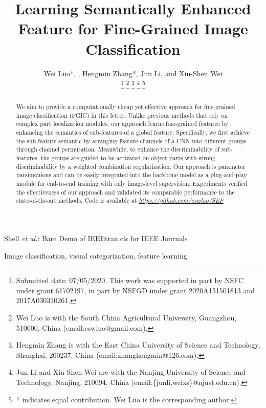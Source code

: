 \documentclass[journal]{IEEEtran}
\begin{document}
\title{Learning Semantically Enhanced Feature for Fine-Grained Image Classification}

\author{Wei Luo*, , Hengmin Zhang*, Jun Li, and Xiu-Shen Wei

\thanks{Submitted date: 07/05/2020. This work was supported in part by NSFC under grant 61702197, in part by NSFGD under grant 2020A151501813 and 2017A030310261.}
\thanks{Wei Luo is with the South China Agricultural University, Guangzhou, 510000, China (email:cswluo@gmail.com).}
\thanks{Hengmin Zhang is with the East China University of Science and Technology, Shanghai, 200237, China (email:zhanghengmin@126.com).}
\thanks{Jun Li and Xiu-Shen Wei are with the Nanjing University of Science and Technology, Nanjing, 210094, China (email:\{junli,weixs\}@njust.edu.cn).}
\thanks{* indicates equal contribution. Wei Luo is the corresponding author.}
}

{Shell \MakeLowercase{\textit{et al.}}: Bare Demo of IEEEtran.cls for IEEE Journals}
\maketitle

\begin{abstract}
We aim to provide a computationally cheap yet effective approach for fine-grained image classification (FGIC) in this letter. 
Unlike previous methods that rely on complex part localization modules,
our approach learns fine-grained features by enhancing the semantics of sub-features of a global feature. 
Specifically, we first achieve the sub-feature semantic by arranging feature channels of a CNN into different groups through channel permutation. Meanwhile, to enhance the discriminability of sub-features, the groups are guided to be activated on object parts with strong discriminability by a weighted combination regularization. Our approach is parameter parsimonious and can be easily integrated into the backbone model as a plug-and-play module for end-to-end training with only image-level supervision.
Experiments verified the effectiveness of our approach and validated its comparable performance to the state-of-the-art methods. Code is available at {\it \url{https://github.com/cswluo/SEF}}
\end{abstract}

\begin{IEEEkeywords}
Image classification, visual categorization, feature learning
\end{IEEEkeywords}
\end{document}
